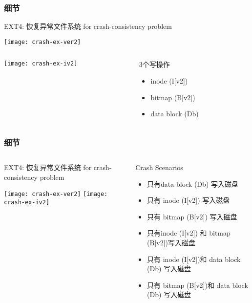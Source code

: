 \begin{frame}[fragile]
	\frametitle{细节}
	EXT4: 恢复异常文件系统 for crash-consistency problem
	
	\centering
	\texttt{[image: crash-ex-ver2]}
	
	
		\begin{columns}
		\begin{column}{.5\textwidth}
			
		
			\centering
	\texttt{[image: crash-ex-iv2]}
			
		\end{column}
		\pause
		\begin{column}{.5\textwidth}			
		3个写操作
		\begin{itemize}
	\item inode (I[v2]) 
	\item bitmap (B[v2])
	\item data block (Db)
\end{itemize}
			
		\end{column}
	\end{columns}
	
\end{frame}



\begin{frame}[fragile]
	\frametitle{细节}
	\begin{columns}
	\begin{column}{.4\textwidth}
	EXT4: 恢复异常文件系统 for crash-consistency problem
	
	\centering
	\texttt{[image: crash-ex-ver2]}
	\texttt{[image: crash-ex-iv2]}	
	\end{column}
	\pause
	\begin{column}{.6\textwidth}			
			Crash Scenarios
			\begin{itemize}
				\item 只有data block (Db) 写入磁盘
				\item 只有 inode (I[v2])  写入磁盘
				\item 只有 bitmap (B[v2])  写入磁盘
				\pause
				\item 只有inode (I[v2]) 和 bitmap (B[v2])写入磁盘
				\item 只有 inode (I[v2])和 data block (Db) 写入磁盘
				\item 只有 bitmap (B[v2])和 data block (Db)  写入磁盘
			\end{itemize}
			
		\end{column}
	\end{columns}
	
\end{frame}

